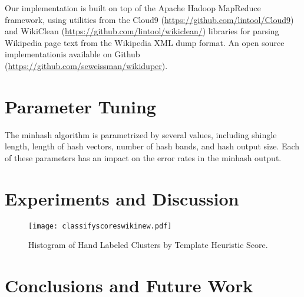 \documentclass{acm_proc_article-sp}
\begin{document}
Our implementation is built on top of the Apache Hadoop MapReduce framework, using utilities from the Cloud9 (\url{https://github.com/lintool/Cloud9}) and WikiClean (\url{https://github.com/lintool/wikiclean/}) libraries for parsing Wikipedia page text from the Wikipedia XML dump format. An open source implementationis available on Github (\url{https://github.com/seweissman/wikiduper}).


\section{Parameter Tuning}

The minhash algorithm is parametrized by several values, including shingle length, length of hash vectors, number of hash bands, and hash output size. Each of these parameters has an impact on the error rates in the minhash output. 


\section{Experiments and Discussion}

\begin{figure}
\centering
\texttt{[image: classifyscoreswikinew.pdf]}
\caption{Histogram of Hand Labeled Clusters by Template Heuristic Score.}
\label{heuristic}
\end{figure}


\section{Conclusions and Future Work}



\balancecolumns
\end{document}
